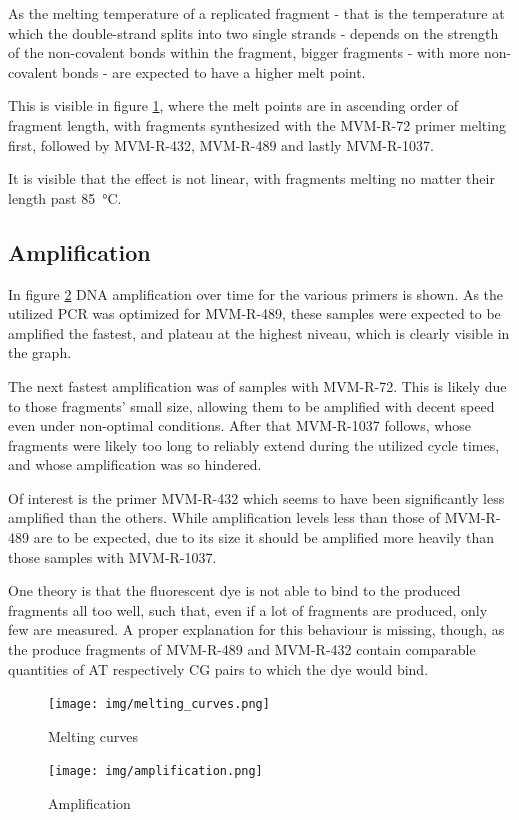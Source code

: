 \documentclass[a4paper,english]{scrreprt}
\begin{document}
As the melting temperature of a replicated fragment - that is the temperature
at which the double-strand splits into two single strands - depends on the
strength of the non-covalent bonds within the fragment, bigger fragments - with
more non-covalent bonds - are expected to have a higher melt point.

This is visible in figure \ref{fig:melting_curves}, where the melt points are
in ascending order of fragment length, with fragments synthesized with the
MVM-R-72 primer melting first, followed by MVM-R-432, MVM-R-489 and lastly
MVM-R-1037.

It is visible that the effect is not linear, with fragments melting no matter
their length past \SI{85}{\celsius}.

\subsection{Amplification}

In figure \ref{fig:amplification} DNA amplification over time for the various
primers is shown. As the utilized PCR was optimized for MVM-R-489, these
samples were expected to be amplified the fastest, and plateau at the highest
niveau, which is clearly visible in the graph.

The next fastest amplification was of samples with MVM-R-72. This is likely due
to those fragments' small size, allowing them to be amplified with decent speed
even under non-optimal conditions. After that MVM-R-1037 follows, whose
fragments were likely too long to reliably extend during the utilized cycle
times, and whose amplification was so hindered.

Of interest is the primer MVM-R-432 which seems to have been significantly less
amplified than the others. While amplification levels less than those of
MVM-R-489 are to be expected, due to its size it should be amplified more
heavily than those samples with MVM-R-1037.

One theory is that the fluorescent dye is not able to bind to the produced
fragments all too well, such that, even if a lot of fragments are produced,
only few are measured. A proper explanation for this behaviour is missing,
though, as the produce fragments of MVM-R-489 and MVM-R-432 contain comparable
quantities of AT respectively CG pairs to which the dye would bind.

\begin{figure}
	\centering
	\texttt{[image: img/melting\_curves.png]}
	\caption{Melting curves}
	\label{fig:melting_curves}
\end{figure}

\begin{figure}
	\centering
	\texttt{[image: img/amplification.png]}
	\caption{Amplification}
	\label{fig:amplification}
\end{figure}




\end{document}
